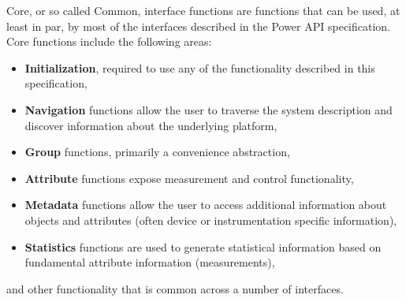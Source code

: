 \newcommand{\ArgHdr}{   \begin{center}
			\begin{tabular}{ | p{5cm} | p{2.1cm} | p{7.5cm} |}
			\hline 
			\textbf{Argument(s)} & \textbf{Input } & \textbf{Description} \\  
			 		     & \textbf{and/or} & \\ 
					     & \textbf{Output} & \\ 
			\hline 
}
\newcommand{\ArgLn}[3]{\texttt{#1} & #2 & #3 \\ \hline}
\newcommand{\ArgFtr}{ 	\end{tabular}
			\end{center}
}



Core, or so called Common, interface functions are functions that can be used, at least in par, by most of the interfaces described in the Power API specification. 
Core functions include the following areas:
\begin{itemize}[noitemsep,nolistsep] 
\item{\textbf{Initialization}, required to use any of the functionality described in this specification, }
\item{\textbf{Navigation}  functions allow the user to traverse the system description and discover information about the underlying platform, }
\item{\textbf{Group} functions, primarily a convenience abstraction,}
\item{\textbf{Attribute} functions expose measurement and control functionality, }
\item{\textbf{Metadata} functions allow the user to access additional information about objects and attributes (often device or instrumentation specific information), }
\item{\textbf{Statistics} functions are used to generate statistical information based on fundamental attribute information (measurements),}
\end{itemize}
and other functionality that is common across a number of interfaces.


